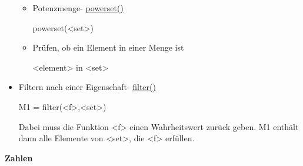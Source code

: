 \documentclass[a4paper,9pt,DIV15,twocolumn]{scrartcl}
\begin{document}
\begin{itemize}
\begin{itemize}
 \item Potenzmenge- \href{https://sage.math.uni-goettingen.de/doc/static/reference/sage/misc/misc.html?highlight=powerset#sage.misc.misc.powerset}{powerset()}
\begin{sagein}
powerset(<set>)
\end{sagein}

 \item Prüfen, ob ein Element in einer Menge ist
\begin{sagein}
<element> in <set>
\end{sagein}
 \end{itemize}

 \item Filtern nach einer Eigenschaft- \href{https://sage.math.uni-goettingen.de/doc/static/reference/sage/combinat/combinat.html?highlight=filter#sage.combinat.combinat.CombinatorialClass.filter}{filter()}
\begin{sagein}
M1 = filter(<f>,<set>)
\end{sagein}
Dabei muss die Funktion <f> einen Wahrheitswert zurück geben.
M1 enthält dann alle Elemente von <set>, die <f> erfüllen.
\end{itemize}


\textbf{Zahlen}
\end{document}
